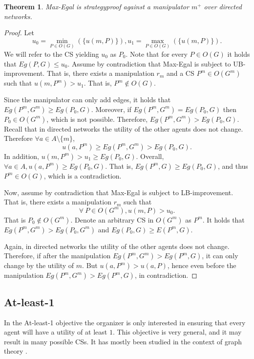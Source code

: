 \documentclass{article}
\newtheorem{theorem}{Theorem}
\begin{document}
\begin{theorem}
\label{thrm:egal_dir_add}
Max-Egal is strategyproof against a manipulator $m^+$ over directed networks.
\end{theorem}
\begin{proof}
Let 
\[
u_0=\underset{P\in O(G)}{\min}(\{u(m,P)\}),
u_1=\underset{P\in O(G)}{\max}(\{u(m,P)\}).
\]
We will refer to the CS yielding $u_0$ as $P_0$. Note that for every $P\in O(G)$ it holds that $Eg(P,G) \leq u_0 $.
Assume by contradiction that Max-Egal is subject to UB-improvement.
That is, there exists a manipulation $r_{m}$ and a CS $P^m\in O(G^{m})$ such that $u(m,P^m) > u_1$. That is, $P^m\notin O(G)$.

Since the manipulator can only add edges, it holds that $Eg(P^{m},G^m)\geq Eg(P_0,G)$. Moreover, if $Eg(P^{m},G^m)=Eg(P_0,G)$ then $P_{0}\in O(G^{m})$, which is not possible. Therefore, $Eg(P^{m},G^m)>Eg(P_0,G)$. Recall that in directed networks the utility of the other agents does not change. Therefore $\forall a \in A \setminus \{m\}$, \[
u(a,P^{m})  \geq Eg(P^{m},G^m) > Eg(P_0,G).
\]
In addition, $u(m,P^{m})>u_1\geq Eg(P_0,G)$. 
Overall, $\forall a \in A, u(a,P^{m}) \geq Eg(P_0,G)$. That is, $Eg(P^{m},G) \geq Eg(P_0,G)$, and thus $P^m\in O(G)$, which is a contradiction.


Now, assume by contradiction that Max-Egal is subject to LB-improvement.
That is, there exists a manipulation $r_{m}$ such that
\begin{equation} \label{ineq:egal_dir}
\forall \  P \in O(G^m), u(m,P) > u_0.
\end{equation} That is $P_0\notin O(G^m)$.
Denote an arbitrary CS in $O(G^m)$ as $P^m$. 
It holds that $Eg(P^m,G^m)>Eg(P_0,G^m)$ and $Eg(P_0,G)\geq E(P^m,G)$.

Again, in directed networks the utility of the other agents does not change. Therefore, if after the manipulation $Eg(P^m,G^m)>Eg(P^m,G)$, it can only change by the utility of $m$. But $u(a,P^m)>u(a,P)$, hence even before the manipulation $Eg(P^m,G^m)>Eg(P^m,G)$, in contradiction.
\end{proof}


\subsection{At-least-1}
\label{sec:least1}
In the At-least-1 objective the organizer is only interested in ensuring that every agent will have a utility of at least $1$. This objective is very general, and it may result in many possible CSs. It has mostly been studied in the context of graph theory \cite{stiebitz1996decomposing,alon2006splitting,bang2016finding}.
\end{document}
